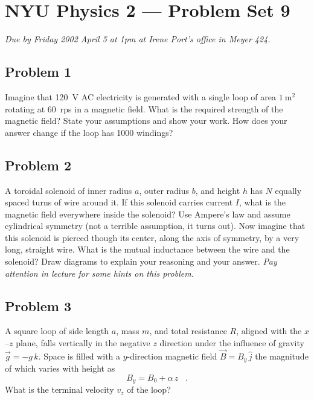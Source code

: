 \documentclass{article}
\begin{document}
\thispagestyle{empty}
\section*{NYU Physics 2 --- Problem Set 9}

\emph{Due by Friday 2002 April 5 at 1pm at Irene Port's office in
Meyer 424.}

\subsection*{Problem 1}

Imagine that 120~V AC electricity is generated with a single loop of
area $1~\mathrm{m^2}$ rotating at 60~rps in a magnetic field.  What is
the required strength of the magnetic field?  State your assumptions
and show your work.  How does your answer change if the loop has 1000
windings?

\subsection*{Problem 2}

A toroidal solenoid of inner radius $a$, outer radius $b$, and height
$h$ has $N$ equally spaced turns of wire around it.  If this solenoid
carries current $I$, what is the magnetic field everywhere inside the
solenoid?  Use Ampere's law and assume cylindrical symmetry (not a
terrible assumption, it turns out).  Now imagine that this solenoid is
pierced though its center, along the axis of symmetry, by a very long,
straight wire.  What is the mutual inductance between the wire and the
solenoid?  Draw diagrams to explain your reasoning and your answer.
\emph{Pay attention in lecture for some hints on this problem.}

\subsection*{Problem 3}

A square loop of side length $a$, mass $m$, and total resistance $R$,
aligned with the $x$--$z$ plane, falls vertically in the negative $z$
direction under the influence of gravity $\vec{g}=-g\,\hat{k}$.  Space
is filled with a $y$-direction magnetic field $\vec{B}=B_y\,\hat{j}$
the magnitude of which varies with height as
\begin{equation}
B_y= B_0+\alpha\,z \;\;\; .
\end{equation}
What is the terminal velocity $v_z$ of the loop?
\end{document}
